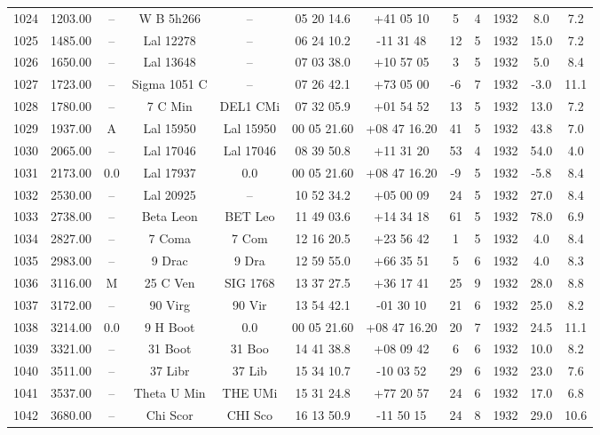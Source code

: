 \begin{table}
\begin{tabular}{cccccccccccc}
1024 & 1203.00 & -- & W B 5h266 & -- & 05 20 14.6 & +41 05 10 & 5 & 4 & 1932 & 8.0 & 7.2 \\
1025 & 1485.00 & -- & Lal 12278 & -- & 06 24 10.2 & -11 31 48 & 12 & 5 & 1932 & 15.0 & 7.2 \\
1026 & 1650.00 & -- & Lal 13648 & -- & 07 03 38.0 & +10 57 05 & 3 & 5 & 1932 & 5.0 & 8.4 \\
1027 & 1723.00 & -- & Sigma 1051 C & -- & 07 26 42.1 & +73 05 00 & -6 & 7 & 1932 & -3.0 & 11.1 \\
1028 & 1780.00 & -- & 7 C Min & DEL1 CMi & 07 32 05.9 & +01 54 52 & 13 & 5 & 1932 & 13.0 & 7.2 \\
1029 & 1937.00 & A & Lal 15950 & Lal 15950 & 00 05 21.60 & +08 47 16.20 & 41 & 5 & 1932 & 43.8 & 7.0 \\
1030 & 2065.00 & -- & Lal 17046 & Lal 17046 & 08 39 50.8 & +11 31 20 & 53 & 4 & 1932 & 54.0 & 4.0 \\
1031 & 2173.00 & 0.0 & Lal 17937 & 0.0 & 00 05 21.60 & +08 47 16.20 & -9 & 5 & 1932 & -5.8 & 8.4 \\
1032 & 2530.00 & -- & Lal 20925 & -- & 10 52 34.2 & +05 00 09 & 24 & 5 & 1932 & 27.0 & 8.4 \\
1033 & 2738.00 & -- & Beta Leon & BET Leo & 11 49 03.6 & +14 34 18 & 61 & 5 & 1932 & 78.0 & 6.9 \\
1034 & 2827.00 & -- & 7 Coma & 7 Com & 12 16 20.5 & +23 56 42 & 1 & 5 & 1932 & 4.0 & 8.4 \\
1035 & 2983.00 & -- & 9 Drac & 9 Dra & 12 59 55.0 & +66 35 51 & 5 & 6 & 1932 & 4.0 & 8.3 \\
1036 & 3116.00 & M & 25 C Ven & SIG 1768 & 13 37 27.5 & +36 17 41 & 25 & 9 & 1932 & 28.0 & 8.8 \\
1037 & 3172.00 & -- & 90 Virg & 90 Vir & 13 54 42.1 & -01 30 10 & 21 & 6 & 1932 & 25.0 & 8.2 \\
1038 & 3214.00 & 0.0 & 9 H Boot & 0.0 & 00 05 21.60 & +08 47 16.20 & 20 & 7 & 1932 & 24.5 & 11.1 \\
1039 & 3321.00 & -- & 31 Boot & 31 Boo & 14 41 38.8 & +08 09 42 & 6 & 6 & 1932 & 10.0 & 8.2 \\
1040 & 3511.00 & -- & 37 Libr & 37 Lib & 15 34 10.7 & -10 03 52 & 29 & 6 & 1932 & 23.0 & 7.6 \\
1041 & 3537.00 & -- & Theta U Min & THE UMi & 15 31 24.8 & +77 20 57 & 24 & 6 & 1932 & 17.0 & 6.8 \\
1042 & 3680.00 & -- & Chi Scor & CHI Sco & 16 13 50.9 & -11 50 15 & 24 & 8 & 1932 & 29.0 & 10.6 \\

\end{tabular}
\end{table}
